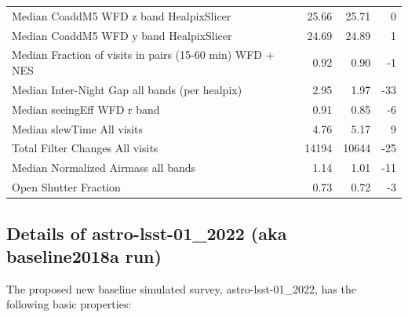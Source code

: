 \documentclass[DM,authoryear,toc]{lsstdoc}
\begin{document}
\begin{table}
\begin{tabular}{lrrr}
Median CoaddM5 WFD z band HealpixSlicer            &               25.66 &               25.71 &          0 \\
Median CoaddM5 WFD y band HealpixSlicer            &               24.69 &               24.89 &          1 \\
Median Fraction of visits in pairs (15-60 min) WFD + NES &                0.92 &                0.90 &         -1 \\
Median Inter-Night Gap all bands (per healpix) &                2.95 &                1.97 &        -33 \\
Median seeingEff WFD r band                        &                0.91 &                0.85 &         -6 \\
Median slewTime All visits                         &                4.76 &                5.17 &          9 \\
Total Filter Changes All visits                    &               14194 &               10644 &        -25 \\
Median Normalized Airmass all bands                       &                1.14 &                1.01 &        -11 \\
Open Shutter Fraction                      &                0.73 &                0.72 &         -3 \\
\bottomrule
\end{tabular}
\label{tab:baseline_comparison}
\end{table}


\subsection{Details of astro-lsst-01\_2022 (aka baseline2018a run)}

The proposed new baseline simulated survey, astro-lsst-01\_2022, has the following basic properties:
\end{document}
